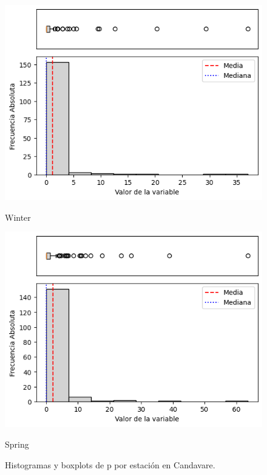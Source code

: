 \begin{figure}[htbp]
\begin{minipage}{0.30\textwidth}
  \includegraphics[width=\linewidth]{resultados/por_estacion_del_anio/boxplot_clases_por_estacion/Candavare/P_HistBoxplot_Winter.png}
  \caption*{Winter}
\end{minipage}
\hfill
\begin{minipage}{0.30\textwidth}
  \includegraphics[width=\linewidth]{resultados/por_estacion_del_anio/boxplot_clases_por_estacion/Candavare/P_HistBoxplot_Spring.png}
  \caption*{Spring}
\end{minipage}
\caption{Histogramas y boxplots de \gls{p}  por estación en Candavare.}
\label{fig:candavare_p_hist}
\end{figure}

